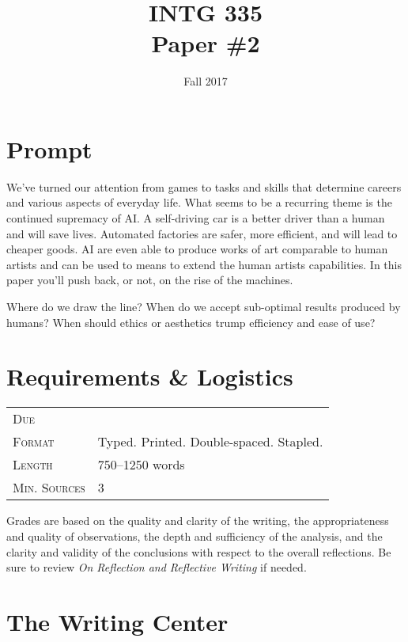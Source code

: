 \documentclass[nobib]{tufte-handout}
\title{INTG 335 \\ Paper \#2 }
\date{ Fall 2017 }
\begin{document}
\maketitle

\section{Prompt}

We've turned our attention from games to tasks and skills that determine careers and various aspects of everyday life. What seems to be a recurring theme is the continued supremacy of AI\@. A self-driving car is a better driver than a human and will save lives. Automated factories are safer, more efficient, and will lead to cheaper goods. AI are even able to produce works of art comparable to human artists and can be used to means to extend the human artists capabilities. In this paper you'll push back, or not, on the rise of the machines.

Where do we draw the line? When do we accept sub-optimal results produced by humans? When should ethics or aesthetics trump efficiency and ease of use? 

\section{Requirements \& Logistics}

\begin{tabular}{ll}
\textsc{Due} &  \\
\textsc{Format} & Typed. Printed. Double-spaced. Stapled. \\
\textsc{Length} & 750--1250 words \\
\textsc{Min. Sources} & 3
\end{tabular}
\vspace{.25in}

Grades are based on the quality and clarity of the writing, the appropriateness and quality of observations, the depth and sufficiency of the analysis, and the clarity and validity of the conclusions with respect to the overall reflections. Be sure to review \textit{On Reflection and Reflective Writing} if needed.

\section{The Writing Center}
\end{document}
